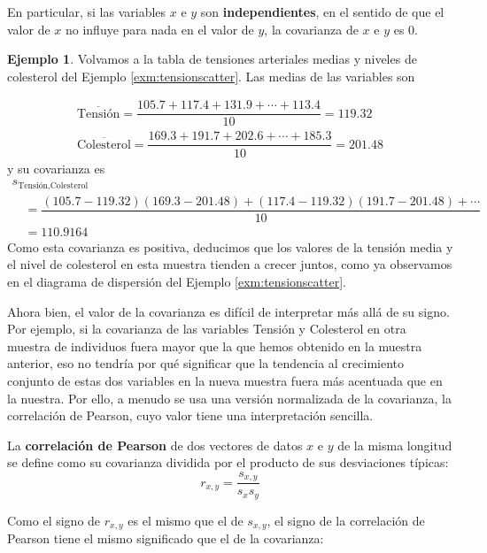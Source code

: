 \documentclass[
]{book}
\theoremstyle{definition}
\theoremstyle{definition}
\newtheorem{example}{Ejemplo}[chapter]
\theoremstyle{definition}
\theoremstyle{definition}
\theoremstyle{remark}
\begin{document}
\begin{rmdimportant}
En particular, si las variables \(x\) e \(y\) son \textbf{independientes}, en el sentido de que el valor de \(x\) no influye para nada en el valor de \(y\), la covarianza de \(x\) e \(y\) es 0.
\end{rmdimportant}

\begin{example}
\protect\hypertarget{exm:unnamed-chunk-310}{}\label{exm:unnamed-chunk-310}Volvamos a la tabla de tensiones arteriales medias y niveles de colesterol del Ejemplo \ref{exm:tensionscatter}. Las medias de las variables son
\end{example}

\[
\begin{array}{l}
\overline{\text{Tensión}}=\dfrac{105.7+117.4+131.9+\cdots+113.4}{10}=119.32\\
\overline{\text{Colesterol}}=\dfrac{169.3+191.7+202.6+\cdots+185.3}{10}=201.48
\end{array}
\]
y su covarianza es
\[
\begin{array}{l}
s_{\text{Tensión},\text{Colesterol}}\\
\quad =\dfrac{(105.7-119.32)(169.3-201.48)+(117.4-119.32)(191.7-201.48)+\cdots}{10}\\
\quad=110.9164
\end{array}
\]
Como esta covarianza es positiva, deducimos que los valores de la tensión media y el nivel de colesterol en esta muestra tienden a crecer juntos, como ya observamos en el diagrama de dispersión del Ejemplo \ref{exm:tensionscatter}.

Ahora bien, el valor de la covarianza es difícil de interpretar más allá de su signo. Por ejemplo, si la covarianza de las variables Tensión y Colesterol en otra muestra de individuos fuera mayor que la que hemos obtenido en la muestra anterior, eso no tendría por qué significar que la tendencia al crecimiento conjunto de estas dos variables en la nueva muestra fuera más acentuada que en la nuestra. Por ello, a menudo se usa una versión normalizada de la covarianza, la correlación de Pearson, cuyo valor tiene una interpretación sencilla.

La \textbf{correlación de Pearson} de dos vectores de datos \(x\) e \(y\) de la misma longitud se define como su covarianza dividida por el producto de sus desviaciones típicas:
\[
r_{x,y}=\frac{s_{x,y}}{s_xs_y}
\]

Como el signo de \(r_{x,y}\) es el mismo que el de \(s_{x,y}\), el signo de la
correlación de Pearson tiene el mismo significado que el de la covarianza:
\end{document}
